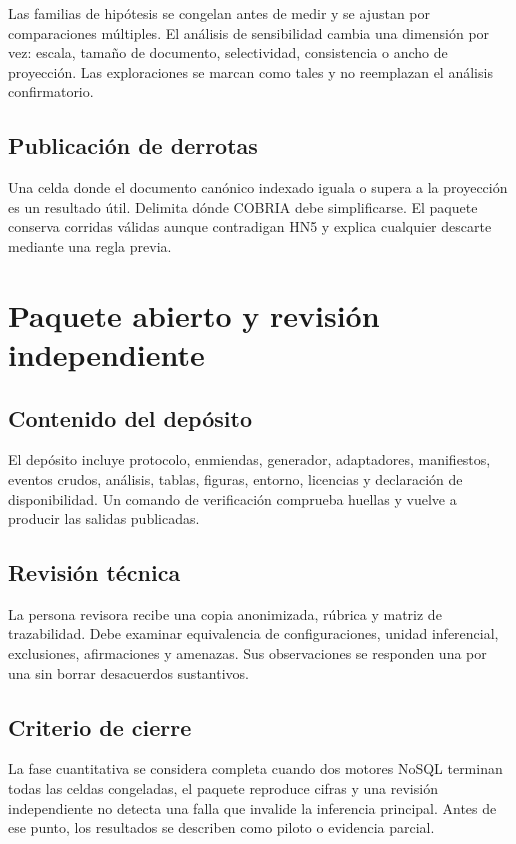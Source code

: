 Las familias de hipótesis se congelan antes de medir y se ajustan por comparaciones
múltiples. El análisis de sensibilidad cambia una dimensión por vez: escala, tamaño de
documento, selectividad, consistencia o ancho de proyección. Las exploraciones se marcan
como tales y no reemplazan el análisis confirmatorio.

\section{Publicación de derrotas}

Una celda donde el documento canónico indexado iguala o supera a la proyección es un
resultado útil. Delimita dónde COBRIA debe simplificarse. El paquete conserva corridas
válidas aunque contradigan HN5 y explica cualquier descarte mediante una regla previa.

\chapter{Paquete abierto y revisión independiente}

\section{Contenido del depósito}

El depósito incluye protocolo, enmiendas, generador, adaptadores, manifiestos, eventos
crudos, análisis, tablas, figuras, entorno, licencias y declaración de disponibilidad.
Un comando de verificación comprueba huellas y vuelve a producir las salidas publicadas.

\section{Revisión técnica}

La persona revisora recibe una copia anonimizada, rúbrica y matriz de trazabilidad. Debe
examinar equivalencia de configuraciones, unidad inferencial, exclusiones, afirmaciones y
amenazas. Sus observaciones se responden una por una sin borrar desacuerdos sustantivos.

\section{Criterio de cierre}

La fase cuantitativa se considera completa cuando dos motores NoSQL terminan todas las
celdas congeladas, el paquete reproduce cifras y una revisión independiente no detecta
una falla que invalide la inferencia principal. Antes de ese punto, los resultados se
describen como piloto o evidencia parcial.

